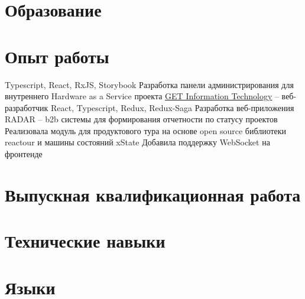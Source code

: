 \documentclass[12pt,a4paper,sans]{moderncv}
\begin{document}
\makecvtitle

\section{Образование}

\section{Опыт работы}
\cvitem{} {Typescript, React, RxJS, Storybook}
\cvitem{} {Разработка панели администрирования для внутреннего Hardware as a Service проекта}
\cvitem{} {}
 {\href{hwww.myget-it.com}{\underline{GET Information Technology}} -- веб-разработчик}
 {React, Typescript, Redux, Redux\--Saga}
\cvitem{} {Разработка веб-приложения RADAR – b2b системы для формирования отчетности по статусу проектов}
\cvitem{} {Реализовала модуль для продуктового тура на основе open source библиотеки reactour и машины состояний xState}
\cvitem{} {Добавила поддержку WebSocket на фронтенде}

\section{Выпускная квалификационная работа}

\section{Технические навыки}

\section{Языки}
\end{document}
